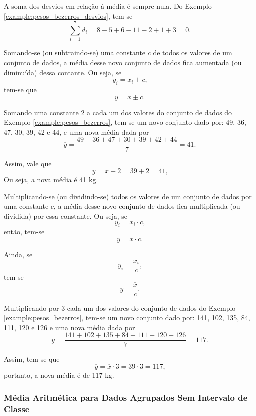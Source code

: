 \documentclass[11pt,fleqn]{book}
\numberwithin{mpicture}{chapter}
\numberwithin{mtable}{chapter}
\numberwithin{mframe}{chapter}
\begin{document}
A soma dos desvios em relação à média é sempre nula. Do Exemplo \ref{example:pesos_bezerros_desvios}, tem-se
\[
	\sum_{i=1}^{7}d_i = 8-5+6-11-2+1+3=0\text{.}
\]

\begin{theorem}
	Somando-se (ou subtraindo-se) uma constante $c$ de todos os valores de um conjunto de dados, a média desse novo conjunto de dados fica aumentada (ou diminuída) dessa contante. Ou seja, se
	\[
		y_i=x_i\pm c\text{,}
	\]
	tem-se que
	\[
		\overline{y}=\overline{x}\pm c\text{.}
	\]
\end{theorem}

\begin{example}
	Somando uma constante 2 a cada um dos valores do conjunto de dados do Exemplo \ref{example:pesos_bezerros}, tem-se um novo conjunto dado por: 49, 36, 47, 30, 39, 42 e 44, e uma nova média dada por
	\[
		\overline{y}=\frac{49+36+47+30+39+42+44}{7}=41\text{.}
	\]
	
	Assim, vale que
	\[
		\overline{y}=\overline{x}+2=39+2=41\text{,}
	\]
	Ou seja, a nova média é 41 kg.
\end{example}

\begin{theorem}
	Multiplicando-se (ou dividindo-se) todos os valores de um conjunto de dados por uma constante $c$, a média desse novo conjunto de dados fica multiplicada (ou dividida) por essa constante. Ou seja, se
	\[
		y_i=x_i\cdot c\text{,}
	\]
	então, tem-se
	\[
		\overline{y}=\overline{x}\cdot c\text{.}
	\]
	
	Ainda, se
	\[
		y_i=\frac{x_i}{c}\text{,}
	\]
	tem-se
	\[
		\overline{y}=\frac{\overline{x}}{c}\text{.}
	\]
\end{theorem}

\begin{example}
	Multiplicando por 3 cada um dos valores do conjunto de dados do Exemplo \ref{example:pesos_bezerros}, tem-se um novo conjunto dado por: 141, 102, 135, 84, 111, 120 e 126 e uma nova média dada por
	\[
		\overline{y}=\frac{141+102+135+84+111+120+126}{7}=117\text{.}
	\]
	
	Assim, tem-se que
	\[
		\overline{y}=\overline{x}\cdot 3=39\cdot 3=117
		\text{,}
	\]
	portanto, a nova média é de 117 kg.
\end{example}

\subsubsection{Média Aritmética para Dados Agrupados Sem Intervalo de Classe}
\end{document}
